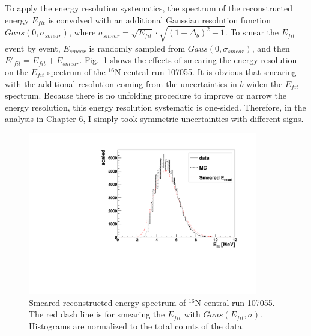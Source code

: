 To apply the energy resolution systematics, the spectrum of the reconstructed energy $E_{fit}$ is convolved with an additional Gaussian resolution function $Gaus(0,\sigma_{smear})$, where $\sigma_{smear}=\sqrt{E_{fit}}\cdot\sqrt{(1+\Delta_{b})^2-1}$. To smear the $E_{fit}$ event by event, $E_{smear}$ is randomly sampled from $Gaus(0,\sigma_{smear})$, and then $E'_{fit}=E_{fit}+E_{smear}$. Fig.~\ref{fig:EresolSmear} shows the effects of smearing the energy resolution on the $E_{fit}$ spectrum of the $^{16}$N central run 107055. It is obvious that smearing with the additional resolution coming from the uncertainties in $b$ widen the $E_{fit}$ spectrum. Because there is no unfolding procedure to improve or narrow the energy resolution, this energy resolution systematic is one-sided\cite{marzec2019measurement}. Therefore, in the analysis in Chapter 6, I simply took symmetric uncertainties with different signs.
\begin{figure}
	\centering
	\includegraphics[width=10cm]{SmearedEresol_N16_new.pdf}
	\caption[Smeared reconstructed energy spectrum of $^{16}$N central run 107055.]{Smeared reconstructed energy spectrum of $^{16}$N central run 107055. The red dash line is for smearing the $E_{fit}$ with $Gaus(E_{fit},\sigma)$. Histograms are normalized to the total counts of the data.}
	\label{fig:EresolSmear}
\end{figure}
